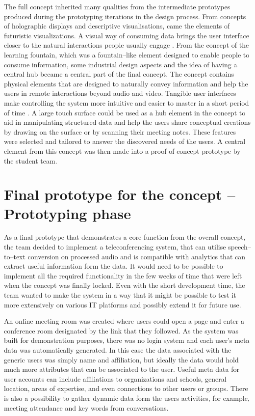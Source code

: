 \documentclass[english,12pt,a4paper,pdftex]{article}
\begin{document}
The full concept inherited many qualities from the intermediate prototypes produced during the prototyping iterations in the design process. From concepts of holographic displays and descriptive visualisations, came the elements of futuristic visualizations. A visual way of consuming data brings the user interface closer to the natural interactions people usually engage \cite{Underkoffler, Shaer}. From the concept of the learning fountain, which was a fountain--like element designed to enable people to consume information, some industrial design aspects and the idea of having a central hub became a central part of the final concept. The concept contains physical elements that are designed to naturally convey information and help the users in remote interactions beyond audio and video. Tangible user interfaces make controlling the system more intuitive and easier to master in a short period of time \cite{Shaer}. A large touch surface could be used as a hub element in the concept to aid in manipulating structured data and help the users share conceptual creations by drawing on the surface or by scanning their meeting notes. These features were selected and tailored to answer the discovered needs of the users. A central element from this concept was then made into a proof of concept prototype by the student team. 

\clearpage

\section{Final prototype for the concept -- Prototyping phase}


As a final prototype that demonstrates a core function from the overall concept, the team decided to implement a teleconferencing system, that can utilise speech--to--text conversion on processed audio and is compatible with analytics that can extract useful information form the data. It would need to be possible to implement all the required functionality in the few weeks of time that were left when the concept was finally locked. Even with the short development time, the team wanted to make the system in a way that it might be possible to test it more extensively on various IT platforms and possibly extend it for future use.

An online meeting room was created where users could open a page and enter a conference room designated by the link that they followed. As the system was built for demonstration purposes, there was no login system and each user's meta data was automatically generated. In this case the data associated with the generic users was simply name and affiliation, but ideally the data would hold much more attributes that can be associated to the user. Useful meta data for user accounts can include affiliations to organizations and schools, general location, areas of expertise, and even connections to other users or groups. There is also a possibility to gather dynamic data form the users activities, for example, meeting attendance and key words from conversations. 
\end{document}
